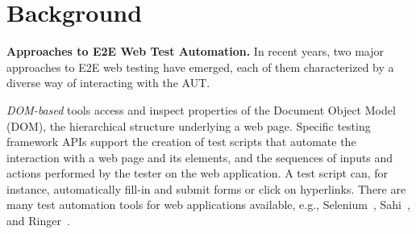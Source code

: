 \section{Background}\label{sec:background}


\noindent
\textbf{Approaches to E2E Web Test Automation.}
In recent years, two major approaches to E2E web testing have emerged, each of them characterized by a diverse way of interacting with the AUT. 

\textit{DOM-based} tools access and inspect properties of the Document Object Model (DOM), the hierarchical structure underlying a web page. 
Specific testing framework APIs support the creation of test scripts that automate the interaction with a web page and its elements, and the sequences of inputs and actions performed by the tester on the web application. A test script can, for instance, automatically fill-in and submit forms or click on hyperlinks. %
There are many test automation tools for web applications available, e.g., Selenium~\cite{selenium}, Sahi~\cite{sahi}, and Ringer~\cite{ringer}. %

